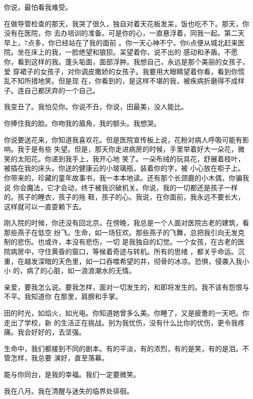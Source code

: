 \documentclass[12pt,a4paper]{article}
\begin{document}
		你说，最怕看我难受。

		在做导管检查的那天，我哭了很久，独自对着天花板发呆，饭也吃不下。那天，你没有在医院，你
	去办培训的准备。可是你的心，一直悬浮着，同我一起。第二天早上，7点多，你已经站在了我的面前
	。你一天心神不宁。你6点便从城北赶来医院。坐在床上的我，一脸绝望和狼狈。呆望着你，说不出的
	感动和矛盾。不愿你，看到这样的我。蓬头垢面，面部浮肿。我想自己，永远是那个美丽的女孩子，爱
	穿裙子的女孩子，对你调皮撒娇的女孩子。我要用大眼睛望着你看，看到你慌乱不知所措地笑。但是现
	在，你看到的，是这样不堪的我，被疾病折磨得不成样子。连自己都厌弃的一个自己。

		我变丑了。我怕见你。你说不丑，你说，田最美，没人能比。

		你捧住我的脸。你吻我的眉角，我的额头。我想哭。

		你说要送花来，你知道我喜欢花。但是医院宣传板上说，花粉对病人呼吸可能有影响。我于是有些
	失望。但是，那天你走进病房的时候，手里举着好大一朵花，微笑的太阳花。你递到我手上，我开心地
	笑了。一朵布绒的玩具花，舒展着枝叶，被插在我的床头。你送的健康云的小玻璃瓶，装着你的字，被
	小心放在柜子上。你带来的，珍藏的童年故事书，我一本本地读。还有那个长颈鹿的小木偶，你骗我说
	你会魔法，它才会动，终于被我识破机关。你说，我的一切都还是孩子一样的。孩子的睡衣，孩子的拖
	鞋，孩子的心。我说，在你面前，我永远不要长大，这样就可以一直耍赖下去。

		刚入院的时候，你还没有回北京。在傍晚，我总是一个人面对医院古老的建筑，看那些燕子在低空
	纷飞。生命，如一场狂欢。那些燕子的飞舞，总把我引向无发克制的悲伤。也或许，本没有悲伤，一切
	是我独自的幻觉。一个女孩，在古老的医院病房中，守住黄昏的窗口，等候着奇迹与转机。所有的思绪
	，都关乎命运。沉重，在越发深暗的天色里，如一口吞噬希望的井，彻骨的冰凉。恐惧，侵袭入我小小
	的，病了的心脏，如一浪浪潮水的无情。

		亲爱，要我怎么说。要我怎样，面对一切发生的，和即将发生的。我不该有怨恨与不平。我知道你
	在那里，肩膀和手掌。

		田的时光，如焰火，如光电。你知道她曾多么美。你睡了，又是疲惫的一天吧。你走出了学校，新
	的生活正在挑战。别为我忧伤，没有什么比你的忧伤，更令我疼痛。我会好好的，去坚强。

		生命中，我们都接到不同的剧本。有的平淡，有的浓烈，有的是笑，有的是泪。不管怎样，我总要
	演好，直至落幕。

		能与你同台，是我的幸福。我们一定要微笑。

	\endwriting



		我在八月。我在清醒与迷失的临界处徘徊。
\end{document}

